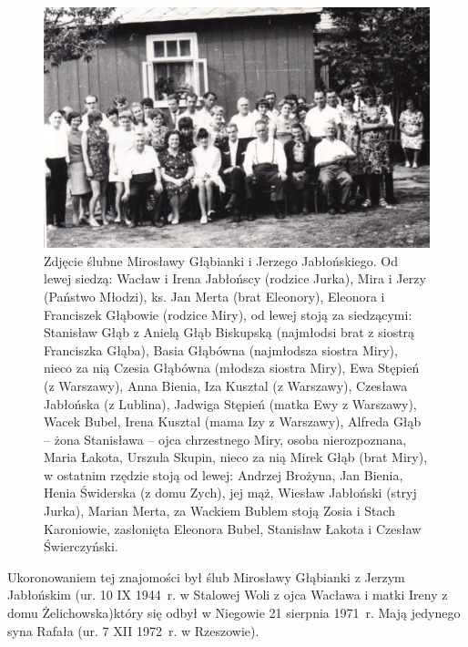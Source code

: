 \begin{figure}[!hb]
\begin{center}
\includegraphics[width=\textwidth]{zdjecia/slub_jerzego_i_miroslawy_jablonskich_zbiorowe.jpg}
\caption[Zbiorowe zdjęcie ślubne Mirosławy i Jerzego Jabłońskich]{Zdjęcie ślubne Mirosławy Głąbianki i Jerzego Jabłońskiego. Od lewej siedzą: Wacław i Irena Jabłońscy (rodzice Jurka), Mira i Jerzy (Państwo Młodzi), ks. Jan Merta (brat Eleonory), Eleonora i Franciszek Głąbowie (rodzice Miry), od lewej stoją za siedzącymi: Stanisław Głąb z Anielą Głąb Biskupską (najmłodsi brat z siostrą Franciszka Głąba), Basia Głąbówna (najmłodsza siostra Miry), nieco za nią Czesia Głąbówna (młodsza siostra Miry), Ewa Stępień (z Warszawy), Anna Bienia, Iza Kusztal (z Warszawy), Czesława Jabłońska (z Lublina), Jadwiga Stępień (matka Ewy z Warszawy), Wacek Bubel, Irena Kusztal (mama Izy z Warszawy), Alfreda Głąb -- żona Stanisława -- ojca chrzestnego Miry, osoba nierozpoznana, Maria Łakota, Urszula Skupin, nieco za nią Mirek Głąb (brat Miry), w ostatnim rzędzie stoją od lewej: Andrzej Brożyna, Jan Bienia, Henia Świderska (z domu Zych), jej mąż, Wiesław Jabłoński (stryj Jurka), Marian Merta, za Wackiem Bublem stoją Zosia i Stach Karoniowie, zasłonięta Eleonora Bubel, Stanisław Łakota i Czesław Świerczyński.}
\label{rys:slub_jerzego_i_miroslawy_jablonskich_zbiorowe}
\end{center}
\end{figure}

Ukoronowaniem tej znajomości był ślub Mirosławy Głąbianki z Jerzym Jabłońskim (ur. 10 IX 1944~r. w Stalowej Woli z ojca Wacława i matki Ireny z domu Żelichowska)który się odbył w Niegowie 21 sierpnia 1971~r. Mają jedynego syna Rafała (ur. 7 XII 1972~r. w Rzeszowie).

